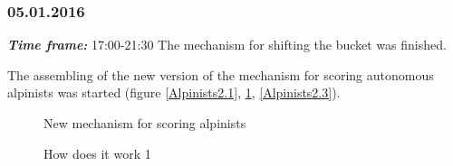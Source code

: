 \subsubsection{05.01.2016}
\textit{\textbf{Time frame:}} 17:00-21:30 \newline
The mechanism for shifting the bucket was finished.

The assembling of the new version of the mechanism for scoring autonomous alpinists was started (figure \ref{Alpinists2.1}, \ref{Alpinists2.2}, \ref{Alpinists2.3}).

\begin{figure}[H]
	\begin{minipage}[h]{0.31\linewidth}
		\caption{New mechanism for scoring alpinists}
		\label{Alpinists2.1}
	\end{minipage}
	\hfill
	\begin{minipage}[h]{0.31\linewidth}
		\caption{How does it work 1}
		\label{Alpinists2.2}
	\end{minipage}
	\hfill
	\begin{minipage}[h]{0.31\linewidth}

\end{minipage}
\end{figure}
